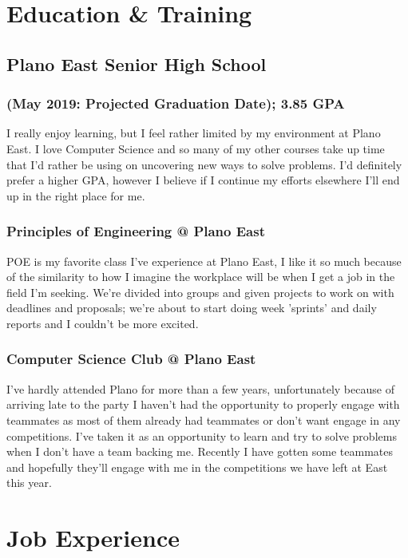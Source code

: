 \documentclass{article}
\begin{document}
\section{Education \& Training}

\subsection{Plano East Senior High School}

\subsubsection{(May 2019: Projected Graduation Date); 3.85 GPA}

I really enjoy learning, but I feel rather limited by my environment at Plano East. I love Computer Science and so many of my other courses take up time that I'd rather be using on uncovering new ways to solve problems. I'd definitely prefer a higher GPA, however I believe if I continue my efforts elsewhere I'll end up in the right place for me.

\subsubsection{Principles of Engineering @ Plano East}

POE is my favorite class I've experience at Plano East, I like it so much because of the similarity to how I imagine the workplace will be when I get a job in the field I'm seeking. We're divided into groups and given projects to work on with deadlines and proposals; we're about to start doing week 'sprints' and daily reports and I couldn't be more excited.

\subsubsection{Computer Science Club @ Plano East}

I've hardly attended Plano for more than a few years, unfortunately because of arriving late to the party I haven't had the opportunity to properly engage with teammates as most of them already had teammates or don't want engage in any competitions. I've taken it as an opportunity to learn and try to solve problems when I don't have a team backing me. Recently I have gotten some teammates and hopefully they'll engage with me in the competitions we have left at East this year.

\section{Job Experience}
\end{document}
